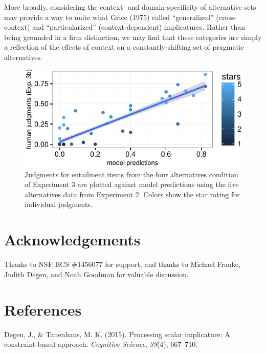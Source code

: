 \documentclass[10pt, letterpaper]{article}
\newenvironment{CodeChunk}{}{}
\begin{document}
More broadly, considering the context- and domain-specificity of
alternative sets may provide a way to unite what Grice (1975) called
``generalized'' (cross-context) and ``particularized''
(context-dependent) implicatures. Rather than being grounded in a firm
distinction, we may find that these categories are simply a reflection
of the effects of context on a constantly-shifting set of pragmatic
alternatives.

\begin{CodeChunk}
\begin{figure}[t]
\includegraphics{figs/fiveAltsScatter-1} \caption[Judgments for entailment items from the four alternatives condition of Experiment 3 are plotted against model predictions using the five alternatives data from Experiment 2]{Judgments for entailment items from the four alternatives condition of Experiment 3 are plotted against model predictions using the five alternatives data from Experiment 2. Colors show the star rating for individual judgments.}\label{fig:fiveAltsScatter}
\end{figure}
\end{CodeChunk}

\section{Acknowledgements}\label{acknowledgements}

Thanks to NSF BCS \#1456077 for support, and thanks to Michael Franke,
Judith Degen, and Noah Goodman for valuable discussion.

\section{References}\label{references}

\setlength{\parindent}{-0.1in} \setlength{\leftskip}{0.125in} \noindent

\hypertarget{refs}{}
\hypertarget{ref-degen2015}{}
Degen, J., \& Tanenhaus, M. K. (2015). Processing scalar implicature: A
constraint-based approach. \emph{Cognitive Science}, \emph{39}(4),
667--710.
\end{document}
